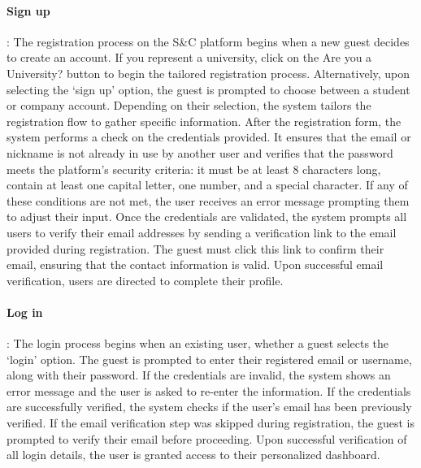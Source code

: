 \paragraph{Sign up}: The registration process on the S\&C platform begins
  when a new guest decides to create an account. If you represent a
  university, click on the \textquotesingle Are you a
  University?\textquotesingle{} button to begin the tailored
  registration process. Alternatively, upon selecting the `sign up'
  option, the guest is prompted to choose between a student or company
  account. Depending on their selection, the system tailors the
  registration flow to gather specific information. After the
  registration form, the system performs a check on the credentials
  provided. It ensures that the email or nickname is not already in use
  by another user and verifies that the password meets the platform's
  security criteria: it must be at least 8 characters long, contain at
  least one capital letter, one number, and a special character. If any
  of these conditions are not met, the user receives an error message
  prompting them to adjust their input. Once the credentials are
  validated, the system prompts all users to verify their email
  addresses by sending a verification link to the email provided during
  registration. The guest must click this link to confirm their email,
  ensuring that the contact information is valid. Upon successful email
  verification, users are directed to complete their profile.

\paragraph{Log in}: The login process begins when an existing user,
  whether a guest selects the `login' option. The guest is prompted to
  enter their registered email or username, along with their password.
  If the credentials are invalid, the system shows an error message and
  the user is asked to re-enter the information. If the credentials are
  successfully verified, the system checks if the user's email has been
  previously verified. If the email verification step was skipped during
  registration, the guest is prompted to verify their email before
  proceeding. Upon successful verification of all login details, the
  user is granted access to their personalized dashboard.

